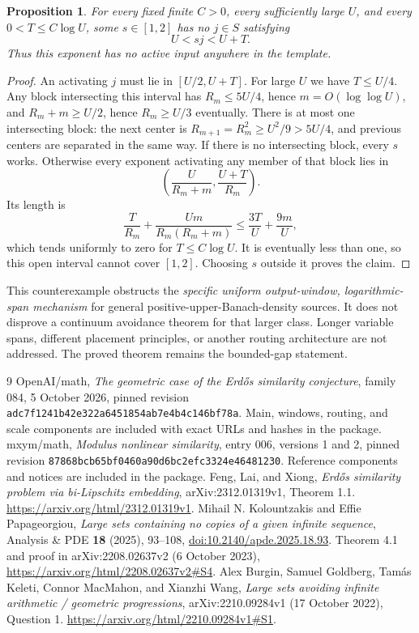 \documentclass[11pt,letterpaper]{article}
\newtheorem{proposition}{Proposition}
\begin{document}
\begin{proposition}\label{prop:sparse}
For every fixed finite $C>0$, every sufficiently large $U$, and every
$0<T\le C\log U$, some $s\in[1,2]$ has no $j\in S$ satisfying
\[
 U<sj<U+T.
\]
Thus this exponent has no active input anywhere in the template.
\end{proposition}
\begin{proof}
An activating $j$ must lie in $[U/2,U+T]$. For large $U$ we have $T\le U/4$.
Any block intersecting this interval has $R_m\le5U/4$, hence
$m=O(\log\log U)$, and $R_m+m\ge U/2$, hence $R_m\ge U/3$ eventually.
There is at most one intersecting block: the next center is
$R_{m+1}=R_m^2\ge U^2/9>5U/4$, and previous centers are separated in the
same way. If there is no intersecting block, every $s$ works. Otherwise every
exponent activating any member of that block lies in
\[
 \left(\frac{U}{R_m+m},\frac{U+T}{R_m}\right).
\]
Its length is
\[
 \frac{T}{R_m}+\frac{Um}{R_m(R_m+m)}
 \le \frac{3T}{U}+\frac{9m}{U},
\]
which tends uniformly to zero for $T\le C\log U$. It is eventually less than
one, so this open interval cannot cover $[1,2]$. Choosing $s$ outside it proves
the claim.
\end{proof}
This counterexample obstructs the \emph{specific uniform output-window,
logarithmic-span mechanism} for general positive-upper-Banach-density sources.
It does not disprove a continuum avoidance theorem for that larger class.
Longer variable spans, different placement principles, or another routing
architecture are not addressed. The proved theorem remains the bounded-gap
statement.

\begin{thebibliography}{9}
 OpenAI/math, \emph{The geometric case of the Erd\H{o}s similarity
conjecture}, family 084, 5 October 2026, pinned revision
\texttt{adc7f1241b42e322a6451854ab7e4b4c146bf78a}.
Main, windows, routing, and scale components are included with exact URLs
and hashes in the package.
 mxym/math, \emph{Modulus nonlinear similarity}, entry 006,
versions 1 and 2, pinned revision
\texttt{87868bcb65bf0460a90d6bc2efc3324e46481230}.
Reference components and notices are included in the package.
 Feng, Lai, and Xiong, \emph{Erd\H{o}s similarity problem via
bi-Lipschitz embedding}, arXiv:2312.01319v1, Theorem 1.1.
\url{https://arxiv.org/html/2312.01319v1}.
 Mihail N. Kolountzakis and Effie Papageorgiou,
\emph{Large sets containing no copies of a given infinite sequence},
Analysis \& PDE \textbf{18} (2025), 93--108,
\href{https://doi.org/10.2140/apde.2025.18.93}{doi:10.2140/apde.2025.18.93}.
Theorem 4.1 and proof in arXiv:2208.02637v2 (6 October 2023),
\url{https://arxiv.org/html/2208.02637v2\#S4}.
 Alex Burgin, Samuel Goldberg, Tam\'as Keleti, Connor MacMahon,
and Xianzhi Wang, \emph{Large sets avoiding infinite arithmetic / geometric
progressions}, arXiv:2210.09284v1 (17 October 2022), Question 1.
\url{https://arxiv.org/html/2210.09284v1\#S1}.
\end{thebibliography}
\end{document}
